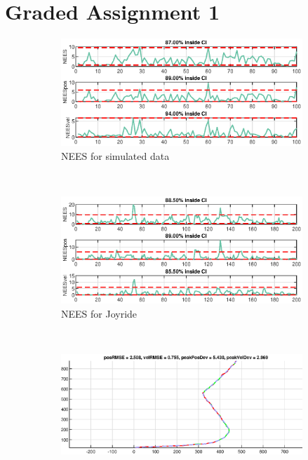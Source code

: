 \section{Graded Assignment 1}\label{sec:graded_assignment_1}

\begin{figure}[ht]
	\begin{subfigure}[b]{0.4\textwidth}
		\includegraphics[width=\textwidth]{figures/ga_1/2_NEES}
		\caption{NEES for simulated data}
		\label{fig:ga_1_2_NEES}
    \end{subfigure}%
    ~
	\begin{subfigure}[b]{0.4\textwidth}
		\includegraphics[width=\textwidth]{figures/ga_1/joyride_NEES}
		\caption{NEES for Joyride}
		\label{fig:ga_1_joyride_NEES}
	\end{subfigure}
        \\
    \begin{subfigure}[b]{0.4\textwidth}
        \includegraphics[width=\textwidth]{figures/ga_1/2_estimated_trajectory}

\end{subfigure}
\end{figure}
